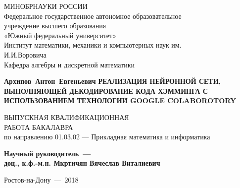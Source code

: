 \normalsize

\thispagestyle{empty}
\begin{titlepage}
\begin{center}

\vfill
МИНОБРНАУКИ РОССИИ\\
\vspace*{0.3cm}
Федеральное государственное автономное образовательное\\
учреждение высшего образования\\
«Южный федеральный университет»\\
\vspace*{0.3cm}
Институт математики, механики и компьютерных наук им.\\
И.И.Воровича\\
Кафедра алгебры и дискретной математики
\vfill

\bigskip

{\large\bf Архипов~Антон~Евгеньевич}
\vfill
{\large\bf РЕАЛИЗАЦИЯ НЕЙРОННОЙ СЕТИ, ВЫПОЛНЯЮЩЕЙ ДЕКОДИРОВАНИЕ КОДА ХЭММИНГА С ИСПОЛЬЗОВАНИЕМ ТЕХНОЛОГИИ GOOGLE COLABOROTORY}

\fontsize{14}{16pt}\selectfont

\vfill
ВЫПУСКНАЯ КВАЛИФИКАЦИОННАЯ\\ РАБОТА БАКАЛАВРА\\
по направлению 01.03.02 — Прикладная математика и информатика
\vfill

{\bf Научный руководитель~---\\
доц., к.ф.-м.н. Мкртичян Вячеслав Виталиевич}

\vfill

\end{center}

\bigskip

\begin{center}
Ростов-на-Дону~---~2018
\end{center}

\end{titlepage}